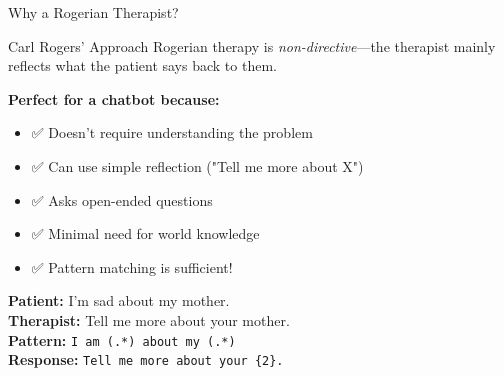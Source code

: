 \documentclass[aspectratio=169]{beamer}
\begin{document}
\begin{frame}{Why a Rogerian Therapist? 🧠}
\small
\begin{block}{Carl Rogers' Approach}
Rogerian therapy is \textit{non-directive}—the therapist mainly reflects what the patient says back to them.
\end{block}

\vspace{0.3cm}

\textbf{Perfect for a chatbot because:}
\begin{itemize}\setlength{\itemsep}{0pt}
    \item ✅ Doesn't require understanding the problem
    \item ✅ Can use simple reflection ("Tell me more about X")
    \item ✅ Asks open-ended questions
    \item ✅ Minimal need for world knowledge
    \item ✅ Pattern matching is sufficient!
\end{itemize}

\vspace{0.3cm}

\begin{discussion}
\textbf{Patient:} I'm sad about my mother.\\
\textbf{Therapist:} Tell me more about your mother.\\
\textbf{Pattern:} \texttt{I am (.*) about my (.*)}\\
\textbf{Response:} \texttt{Tell me more about your \{2\}.}
\end{discussion}
\end{frame}
\end{document}
